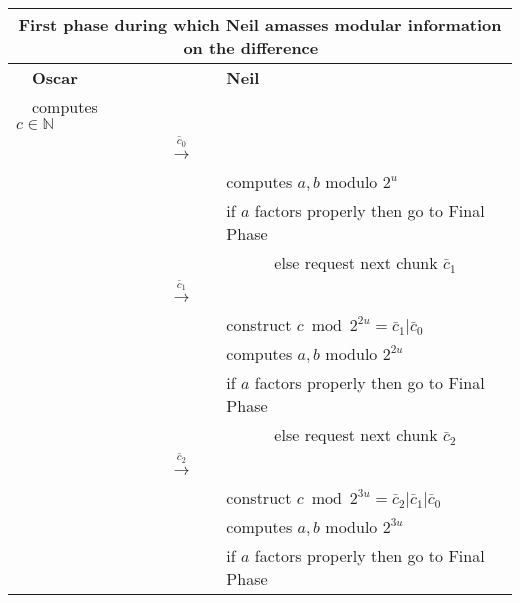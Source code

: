 \documentclass[11pt]{llncs}
\begin{document}
\begin{center}
\begin{tabular}{lcl}\toprule
\multicolumn{3}{c}{{\sf First phase during which Neil amasses modular
information on the difference~~}} \\\midrule
~~{\bf Oscar}                      &                                                      &   {\bf Neil}~\\
~~computes $c\in \mathbb{N}$       &                                                      &\\
                                   &~~{{\LARGE $\stackrel{\bar{c}_0}{\longrightarrow}$}}~~&   \\
                                   &                                                      &computes $a,b$ modulo $2^u$~\\
                                   &                                                      &if $a$ factors properly then go to {\sf Final Phase}~~\\
                                   &                                                      &~~~~~~else request next chunk $\bar{c}_1$~~\\
                                   &~~{{\LARGE $\stackrel{\bar{c}_1}{\longrightarrow}$}}~~&   \\
                                   &                                                      &construct $c \bmod 2^{2u}=\bar{c}_1|\bar{c}_0$~~\\
                                   &                                                      &computes $a,b$ modulo $2^{2u}$~\\
                                   &                                                      &if $a$ factors properly then go to {\sf Final Phase}~~\\
                                   &                                                      &~~~~~~else request next chunk $\bar{c}_2$~~\\
                                   &~~{{\LARGE $\stackrel{\bar{c}_2}{\longrightarrow}$}}~~      &   \\
                                   &                                                      &construct $c\bmod 2^{3u}=\bar{c}_2|\bar{c}_1|\bar{c}_0$~~\\
                                   &                                                      &computes $a,b$ modulo $2^{3u}$~\\
                                   &                                                      &if $a$ factors properly then go to {\sf Final Phase}~~\\

\end{tabular}
\end{center}
\end{document}
